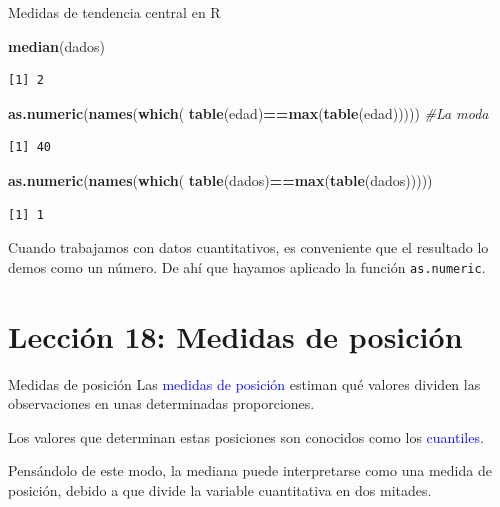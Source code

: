 \documentclass[
  ignorenonframetext,
  aspectratio=169]{beamer}
\newenvironment{Shaded}{\begin{snugshade}}{\end{snugshade}}
\newcommand{\CommentTok}[1]{\textcolor[rgb]{0.56,0.35,0.01}{\textit{#1}}}
\newcommand{\FunctionTok}[1]{\textcolor[rgb]{0.13,0.29,0.53}{\textbf{#1}}}
\newcommand{\NormalTok}[1]{#1}
\newcommand{\SpecialCharTok}[1]{\textcolor[rgb]{0.81,0.36,0.00}{\textbf{#1}}}
\newcommand\blue[1]{\textcolor{blue}{#1}}
\begin{document}
\begin{frame}[fragile]{Medidas de tendencia central en R}
\label{medidas-de-tendencia-central-en-r-1}
\begin{Shaded}
\begin{Highlighting}[]
\FunctionTok{median}\NormalTok{(dados)}
\end{Highlighting}
\end{Shaded}

\begin{verbatim}
[1] 2
\end{verbatim}

\begin{Shaded}
\begin{Highlighting}[]
\FunctionTok{as.numeric}\NormalTok{(}\FunctionTok{names}\NormalTok{(}\FunctionTok{which}\NormalTok{(}
  \FunctionTok{table}\NormalTok{(edad)}\SpecialCharTok{==}\FunctionTok{max}\NormalTok{(}\FunctionTok{table}\NormalTok{(edad))))) }\CommentTok{\#La moda}
\end{Highlighting}
\end{Shaded}

\begin{verbatim}
[1] 40
\end{verbatim}

\begin{Shaded}
\begin{Highlighting}[]
\FunctionTok{as.numeric}\NormalTok{(}\FunctionTok{names}\NormalTok{(}\FunctionTok{which}\NormalTok{(}
  \FunctionTok{table}\NormalTok{(dados)}\SpecialCharTok{==}\FunctionTok{max}\NormalTok{(}\FunctionTok{table}\NormalTok{(dados)))))}
\end{Highlighting}
\end{Shaded}

\begin{verbatim}
[1] 1
\end{verbatim}

Cuando trabajamos con datos cuantitativos, es conveniente que el
resultado lo demos como un número. De ahí que hayamos aplicado la
función \texttt{as.numeric}.
\end{frame}

\section{Lección 18: Medidas de
posición}\label{lecciuxf3n-18-medidas-de-posiciuxf3n}

\begin{frame}{Medidas de posición}
\label{medidas-de-posiciuxf3n}
Las \blue{medidas de posición} estiman qué valores dividen las
observaciones en unas determinadas proporciones.

Los valores que determinan estas posiciones son conocidos como los
\blue{cuantiles}.

Pensándolo de este modo, la mediana puede interpretarse como una medida
de posición, debido a que divide la variable cuantitativa en dos
mitades.
\end{frame}
\end{document}
